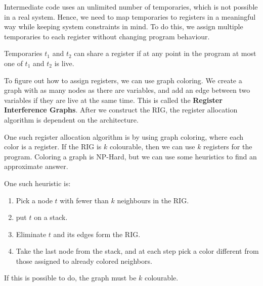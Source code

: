 \documentclass[12pt,letterpaper]{book}
\theoremstyle{definition}
\begin{document}
Intermediate code uses an unlimited number of temporaries, which is not possible in a real system. Hence, we need to map temporaries to registers in a meaningful way while keeping system constraints in mind. To do this, we assign multiple temporaries to each register without changing program behaviour.

Temporaries $t_1$ and $t_2$ can share a register if at any point in the program at most one of $t_1$ and $t_2$ is live.

To figure out how to assign registers, we can use graph coloring. We create a graph with as many nodes as there are variables, and add an edge between two variables if they are live at the same time. This is called the \textbf{Register Interference Graphs}. After we construct the RIG, the register allocation algorithm is dependent on the architecture.

One such register allocation algorithm is by using graph coloring, where each color is a register. If the RIG is $k$ colourable, then we can use $k$ registers for the program. Coloring a graph is NP-Hard, but we can use some heuristics to find an approximate answer.

One such heuristic is:
\begin{enumerate}
  \item Pick a node $t$ with fewer than $k$ neighbours in the RIG.
  \item put $t$ on a stack.
  \item Eliminate $t$ and its edges form the RIG.
  \item Take the last node from the stack, and at each step pick a color different from those assigned to already colored neighbors.
\end{enumerate}
If this is possible to do, the graph must be $k$ colourable.
\end{document}
